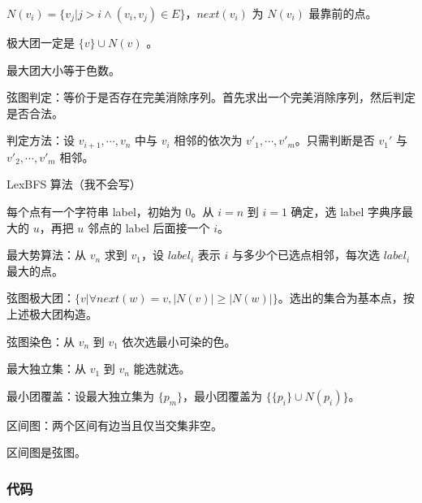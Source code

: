 \documentclass[12pt]{ctexart}
\begin{document}
$N(v_i)=\{v_j|j>i\land (v_i,v_j)\in E\}$，$next(v_i)$ 为 $N(v_i)$ 最靠前的点。

极大团一定是 $\{v\}\cup N(v)$ 。

最大团大小等于色数。

弦图判定：等价于是否存在完美消除序列。首先求出一个完美消除序列，然后判定是否合法。

判定方法：设 $v_{i+1},\cdots,v_n$ 中与 $v_i$ 相邻的依次为 $v'_1,\cdots,v'_m$。只需判断是否 $v_1'$ 与 $v'_2,\cdots,v'_m$ 相邻。

LexBFS 算法（我不会写）

每个点有一个字符串 label，初始为 $0$。从 $i=n$ 到 $i=1$ 确定，选 label 字典序最大的 $u$，再把 $u$ 邻点的 label 后面接一个 $i$。

最大势算法：从 $v_n$ 求到 $v_1$，设 $label_i$ 表示 $i$ 与多少个已选点相邻，每次选 $label_i$ 最大的点。

弦图极大团：$\{v|\forall next(w)=v,|N(v)|\ge |N(w)|\}$。选出的集合为基本点，按上述极大团构造。

弦图染色：从 $v_n$ 到 $v_1$ 依次选最小可染的色。

最大独立集：从 $v_1$ 到 $v_n$ 能选就选。

最小团覆盖：设最大独立集为 $\{p_m\}$，最小团覆盖为 $\{\{p_i\}\cup N(p_i)\}$。

区间图：两个区间有边当且仅当交集非空。

区间图是弦图。

\subsubsection{代码}
\end{document}
